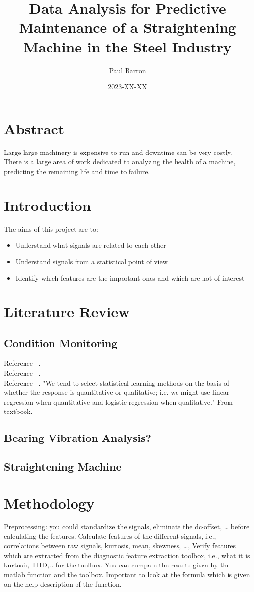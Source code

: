 \documentclass{article}
\title{Data Analysis for Predictive Maintenance of a Straightening Machine in the Steel Industry}
\date{2023-XX-XX}
\author{Paul Barron}
\begin{document}
\maketitle
\newpage
{}
\tableofcontents
\newpage
\section{Abstract}
Large large machinery is expensive to run and downtime can be very costly. There is a large area of work dedicated to analyzing the health of a machine, predicting the remaining life and time to failure.
\newpage
\section{Introduction}
The aims of this project are to:
\begin{itemize}
\item Understand what signals are related to each other
\item Understand signals from a statistical point of view
\item Identify which features are the important ones and which are not of interest
\end{itemize}
\clearpage  
\section{Literature Review}
\subsection{Condition Monitoring}
Reference ~\cite{caesarendra2017review}.\\
Reference ~\cite{james2013introduction}.\\
Reference ~\cite{soualhi2021novel}.
"We tend to select statistical learning methods on the basis of whether
the response is quantitative or qualitative; i.e. we might use linear regression when quantitative and logistic regression when qualitative." From textbook.
\subsection{Bearing Vibration Analysis?}
\subsection{Straightening Machine}
\clearpage 
\section{Methodology}
Preprocessing: you could standardize the signals, eliminate the dc-offset, … before calculating the features.
Calculate features of the different signals, i.e., correlations between raw signals, kurtosis, mean, skewness, …,
Verify features which are extracted from the diagnostic feature extraction toolbox, i.e., what it is kurtosis, THD,… for the toolbox. You can compare the results given by the matlab function and the toolbox. Important to look at the formula which is given on the help description of the function.
\end{document}
